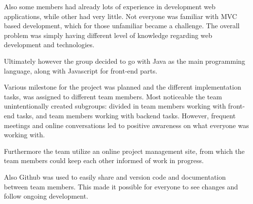 Also some members had already lots of experience in development web applications, while other had very little. Not everyone was familiar with MVC based development, which for those unfamiliar became a challenge. The overall problem was simply having different level of knowledge regarding web development and technologies.

Ultimately however the group decided to go with Java as the main programming language, along with Javascript for front-end parts.

Various milestone for the project was planned and the different implementation tasks, was assigned to different team members. Most noticeable the team unintentionally created subgroups: divided in team members working with front-end tasks, and team members working with backend tasks.
However, frequent meetings and online conversations led to positive awareness on what everyone was working with.

Furthermore the team utilize an online project management site, from which the team members could keep each other informed of work in progress.

Also Github was used to easily share and version code and documentation between team members. This made it possible for everyone to see changes and follow ongoing development.

